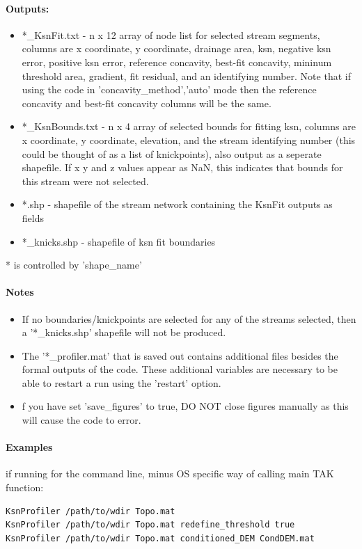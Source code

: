 \paragraph{Outputs:}
\begin{itemize}
\item *\_KsnFit.txt - n x 12 array of node list for selected stream segments, columns are x coordinate, y coordinate, drainage area, ksn, negative ksn error,
positive ksn error, reference concavity, best-fit concavity, mininum threshold area, gradient, fit residual, and an identifying number. Note
that if using the code in 'concavity\_method','auto' mode then the reference concavity and best-fit concavity columns will be the same.
\item *\_KsnBounds.txt - n x 4 array of selected bounds for fitting ksn, columns are x coordinate, y coordinate, elevation, and the stream identifying number 
(this could be thought of as a list of knickpoints), also output as a seperate shapefile. If x y and z values appear as NaN, this indicates
that bounds for this stream were not selected. 
\item *.shp - shapefile of the stream network containing the KsnFit outputs as fields
\item *\_knicks.shp - shapefile of ksn fit boundaries
\end{itemize}
* is controlled by 'shape\_name'

\paragraph{Notes}
\begin{itemize}
\item If no boundaries/knickpoints are selected for any of the streams selected, then a '*\_knicks.shp' shapefile will not be produced.
\item The '*\_profiler.mat' that is saved out contains additional files besides the formal outputs of the code. These additional variables
are necessary to be able to restart a run using the 'restart' option.
\item f you have set 'save\_figures' to true, DO NOT close figures manually as this will cause the code to error.
\end{itemize}

\paragraph{Examples} if running for the command line, minus OS specific way of calling main TAK function:
\begin{lstlisting}[language=bash]
KsnProfiler /path/to/wdir Topo.mat
KsnProfiler /path/to/wdir Topo.mat redefine_threshold true 
KsnProfiler /path/to/wdir Topo.mat conditioned_DEM CondDEM.mat
\end{lstlisting}

